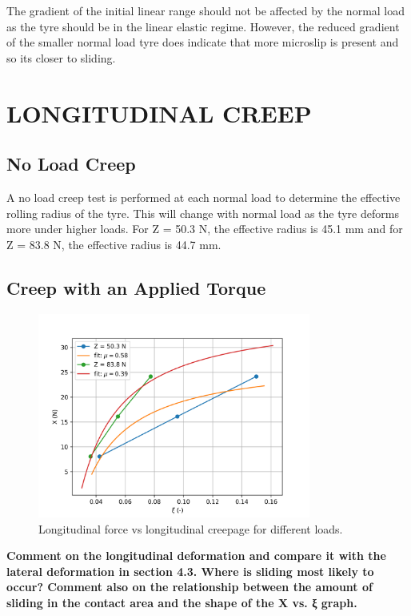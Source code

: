 \documentclass{article}
\begin{document}
The gradient of the initial linear range should not be affected by the normal load as the tyre should be in the linear elastic regime.
However, the reduced gradient of the smaller normal load tyre does indicate that more microslip is present and so its closer to sliding.

\section{LONGITUDINAL CREEP}

\subsection{\textbf{No Load Creep} \label{no_load_creep}}

A no load creep test is performed at each normal load to determine the effective rolling radius of the tyre.
This will change with normal load as the tyre deforms more under higher loads.
For Z = 50.3 N, the effective radius is 45.1 mm and for Z = 83.8 N, the effective radius is 44.7 mm.

\subsection{\textbf{Creep with an Applied Torque}}

\begin{figure}[H]
    \centering
    \includegraphics[width=0.8\textwidth]{52.png}
    \caption{Longitudinal force vs longitudinal creepage for different loads.}
    \label{fig:longitudinal_force_vs_creepage}
\end{figure}

\begin{center}
    \textbf{ Comment on the longitudinal deformation and compare it with the lateral deformation
    in section 4.3. Where is sliding most likely to occur? Comment also on the
    relationship between the amount of sliding in the contact area and the shape of the X
    vs. ξ graph.}
\end{center}
\end{document}
